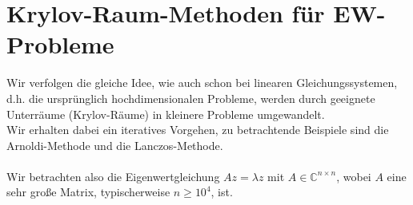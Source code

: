 
\section{Krylov-Raum-Methoden für EW-Probleme}
Wir verfolgen die gleiche Idee, wie auch schon bei linearen Gleichungssystemen, d.h. die ursprünglich hochdimensionalen
Probleme, werden durch geeignete Unterräume (Krylov-Räume) in kleinere Probleme umgewandelt. \\
Wir erhalten dabei ein iteratives Vorgehen, zu betrachtende Beispiele sind die Arnoldi-Methode und die 
Lanczos-Methode.\\ \\
Wir betrachten also die Eigenwertgleichung $Az=\lambda z$ mit $A\in\mathbb{C}^{n\times n}$, wobei $A$ eine sehr große
Matrix, typischerweise $n\geq 10^4$, ist.
